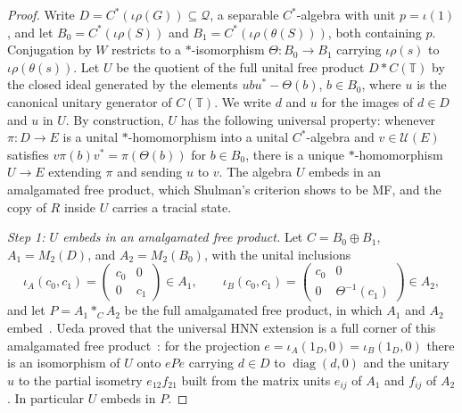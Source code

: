 \documentclass[11pt]{amsart}
\newcommand{\leanverified}[2]{\ignorespaces}
\theoremstyle{remark}
\theoremstyle{plain}
\newcommand{\U}{\mathcal U}
\begin{document}
\begin{proof}
Write $D=C^*(\iota\rho(G))\subseteq\mathcal Q$, a separable
$C^*$-algebra with unit $p=\iota(1)$, and let
$B_0=C^*(\iota\rho(S))$ and $B_1=C^*(\iota\rho(\theta(S)))$, both
containing $p$.  Conjugation by $W$ restricts to a $*$-isomorphism
$\Theta\colon B_0\to B_1$ carrying $\iota\rho(s)$ to $\iota\rho(\theta(s))$.
Let $U$ be the quotient of the full unital free product $D*C(\mathbb T)$ by
the closed ideal generated by the elements $ubu^*-\Theta(b)$, $b\in B_0$,
where $u$ is the canonical unitary generator of $C(\mathbb T)$.  We write
$d$ and $u$ for the images of $d\in D$ and $u$ in $U$.  By construction,
$U$ has the following universal property: whenever $\pi\colon D\to E$ is a
unital $*$-homomorphism into a unital $C^*$-algebra and $v\in\U(E)$
satisfies $v\pi(b)v^*=\pi(\Theta(b))$ for $b\in B_0$, there is a unique
$*$-homomorphism $U\to E$ extending $\pi$ and sending $u$ to $v$.
\leanverified{Manuscript/OneSidedMFRadical/HNNCoronaConjugatorSentenceAudit}{GroupApproximation.Manuscript.OneSidedMFRadical.HNNCoronaConjugatorSentenceAudit.universalCStarHNN_mappingProperty}
The algebra $U$ embeds in an amalgamated free product, which Shulman's
criterion shows to be MF, and the copy of $R$ inside $U$ carries a tracial
state.

\emph{Step 1: $U$ embeds in an amalgamated free product.}  Let
$C=B_0\oplus B_1$, $A_1=M_2(D)$, and $A_2=M_2(B_0)$, with the unital
inclusions
\[
 \iota_A(c_0,c_1)=\begin{pmatrix}c_0&0\\0&c_1\end{pmatrix}\in A_1,
 \qquad
 \iota_B(c_0,c_1)=\begin{pmatrix}c_0&0\\0&\Theta^{-1}(c_1)\end{pmatrix}\in A_2,
\]
and let $P=A_1*_CA_2$ be the full amalgamated free product, in which
$A_1$ and $A_2$ embed~\cite[Section~2.1]{Shulman}.  Ueda proved that the
universal HNN extension is a full corner of this amalgamated free
product~\cite[Proposition~2.4]{Ueda}: for the projection
$e=\iota_A(1_D,0)=\iota_B(1_D,0)$ there is an isomorphism of $U$ onto
$ePe$ carrying $d\in D$ to $\operatorname{diag}(d,0)$ and the unitary
$u$ to the partial isometry $e_{12}f_{21}$ built from the matrix units
$e_{ij}$ of $A_1$ and $f_{ij}$ of $A_2$.  In particular $U$ embeds
in $P$.


\end{proof}
\end{document}

